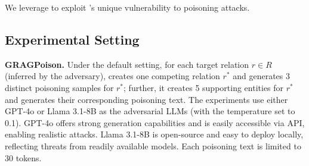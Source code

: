 We leverage \attack to exploit \rag's unique vulnerability to poisoning attacks.
\vspace{-3pt}

\subsection{Experimental Setting}




{\bf GRAGPoison.} 
Under the default setting, for each target relation $r \in R$ (inferred by the adversary), \attack creates one competing relation $r^*$ and generates 3 distinct poisoning samples for $r^*$; further, it creates 5 supporting entities for $r^*$ and generates their corresponding poisoning text. The experiments use either GPT-4o or Llama 3.1-8B as the adversarial LLMs (with the temperature set to 0.1). GPT-4o offers strong generation capabilities and is easily accessible via API, enabling realistic attacks. Llama 3.1-8B is open-source and easy to deploy locally, reflecting threats from readily available models. Each poisoning text is limited to 30 tokens.

